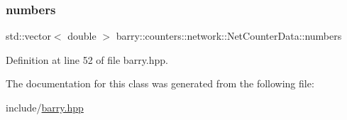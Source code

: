 \mbox{\label{classbarry_1_1counters_1_1network_1_1_net_counter_data_a720381c090feafdf9652f0ca19c5cc4b}} 
\subsubsection{\texorpdfstring{numbers}{numbers}}
{\footnotesize\ttfamily std\+::vector$<$ double $>$ barry\+::counters\+::network\+::\+Net\+Counter\+Data\+::numbers}



Definition at line 52 of file barry.\+hpp.



The documentation for this class was generated from the following file\+:\begin{DoxyCompactItemize}
\item 
include/\hyperlink{barry_8hpp}{barry.\+hpp}\end{DoxyCompactItemize}
